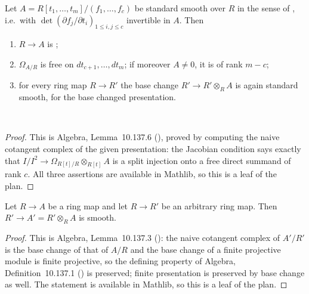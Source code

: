 \begin{lemma}
\label{lem:pc-standard-smooth-properties}
Let $A=R[t_1,\dots,t_m]/(f_1,\dots,f_c)$ be standard smooth over $R$ in the sense of
, i.e.\ with
$\det(\partial f_j/\partial t_i)_{1\le i,j\le c}$ invertible in $A$.  Then
\begin{enumerate}
\item $R\to A$ is ;
\item $\Omega_{A/R}$ is free on $dt_{c+1},\dots,dt_m$; if moreover $A\ne0$, it is of rank
  $m-c$;
\item for every ring map $R\to R'$ the base change $R'\to R'\otimes_RA$ is again standard
  smooth, for the base changed presentation.
\end{enumerate}
\mathlibok\ 
\end{lemma}
\begin{proof}
This is Algebra, Lemma~10.137.6 (), proved by computing the naive
cotangent complex of the given presentation: the Jacobian condition says exactly that
$I/I^2\to\Omega_{R[t]/R}\otimes_{R[t]}A$ is a split injection onto a free direct summand of
rank $c$.  All three assertions are available in Mathlib, so this is a leaf of the plan.
\end{proof}

\begin{lemma}
\label{lem:pc-smooth-base-change-ring}
Let $R\to A$ be a  ring map and let $R\to R'$ be an
arbitrary ring map.  Then $R'\to A'=R'\otimes_RA$ is smooth.
\mathlibok\ 
\end{lemma}
\begin{proof}
This is Algebra, Lemma~10.137.3 (): the naive cotangent complex of
$A'/R'$ is the base change of that of $A/R$ and the base change of a finite projective module
is finite projective, so the defining property of Algebra, Definition~10.137.1
() is preserved; finite presentation is preserved by base change as
well.  The statement is available in Mathlib, so this is a leaf of the plan.
\end{proof}

